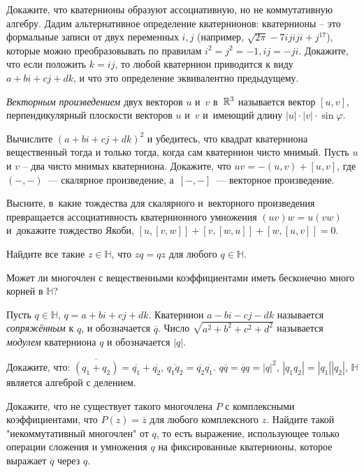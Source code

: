 \documentclass[a4paper, 12pt]{article}
\begin{document}
	 Докажите, что кватернионы образуют ассоциативную, но не коммутативную алгебру.  Дадим альтернативное определение кватернионов: кватернионы -- это формальные записи от двух переменных $i,j$ (например, $\sqrt{2\pi}-7ijiji+j^{17}$), которые можно преобразовывать по правилам $i^2=j^2=-1, ij=-ji$. Докажите, что если положить $k=ij$, то любой кватернион приводится к виду $a+bi+cj+dk$, и что это определение эквивалентно предыдущему.

\emph{Векторным произведением} двух векторов $u$ и~$v$ в~$\mathbb{R}^3$ называется вектор $[u,v]$, перпендикулярный плоскости векторов $u$ и~$v$ и~имеющий длину $|u|\cdot|v|\cdot\sin\varphi$.

	 Вычислите $(a+bi+cj+dk)^2$ и убедитесь, что квадрат кватерниона вещественный тогда и только тогда, когда сам кватернион чисто мнимый.  Пусть $u$ и $v$ -- два чисто мнимых кватерниона. Докажите, что $uv=-(u,v)+[u,v]$, где $({-},{-})$~--- скалярное произведение, а~$[{-},{-}]$~--- векторное произведение.

Высните, в~какие тождества для скалярного и~векторного произведения превращается ассоциативность кватернионного умножения $(uv)w=u(vw)$ и~докажите тождество Якоби, $[u,[v,w]]+[v,[w,u]]+[w,[u,v]]=0$.

	Найдите все такие $z \in \mathbb{H}$, что $zq=qz$ для любого $q \in \mathbb{H}$.

	Может ли многочлен с вещественными коэффициентами иметь бесконечно много корней в $\mathbb{H}$?


\newpage


	Пусть $q \in \mathbb{H}$, $q=a+bi+cj+dk$. Кватернион $a-bi-cj-dk$ называется \emph{сопряжённым} к $q$, и обозначается $\overline{q}$. Число $\sqrt{a^2+b^2+c^2+d^2}$ называется \emph{модулем} кватерниона $q$ и обозначается $|q|$.

	Докажите, что:  $\overline{(q_1+q_2)}=\overline{q_1}+\overline{q_2}$, $\overline{q_1q_2}=\overline{q_2}\overline{q_1}$.  $q \overline{q} = \overline{q} q = |q|^2$, $|q_1q_2|=|q_1||q_2|$,  $\mathbb{H}$ является алгеброй с делением.

	 Докажите, что не существует такого многочлена $P$ с комплексными коэффициентами, что $P(z)=\overline{z}$ для любого комплексного $z$.  Найдите такой "некоммутативный многочлен" от $q$, то есть выражение, использующее только операции сложения и умножения $q$ на фиксированные кватернионы, которое выражает $\overline{q}$ через $q$.
\end{document}
